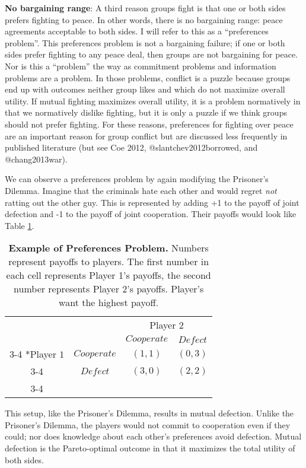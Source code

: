 \documentclass[11pt]{article}
\begin{document}
\textbf{No bargaining range}: A third reason groups fight is that one or
both sides prefers fighting to peace. In other words, there is no
bargaining range: peace agreements acceptable to both sides. I will
refer to this as a ``preferences problem''. This preferences problem is
not a bargaining failure; if one or both sides prefer fighting to any
peace deal, then groups are not bargaining for peace. Nor is this a
``problem'' the way as commitment problems and information problems are
a problem. In those problems, conflict is a puzzle because groups end up
with outcomes neither group likes and which do not maximize overall
utility. If mutual fighting maximizes overall utility, it is a problem
normatively in that we normatively dislike fighting, but it is only a
puzzle if we think groups should not prefer fighting. For these reasons,
preferences for fighting over peace are an important reason for group
conflict but are discussed less frequently in published literature (but
see Coe 2012, @slantchev2012borrowed, and @chang2013war).

We can observe a preferences problem by again modifying the Prisoner's
Dilemma. Imagine that the criminals hate each other and would regret
\emph{not} ratting out the other guy. This is represented by adding +1
to the payoff of joint defection and -1 to the payoff of joint
cooperation. Their payoffs would look like Table \ref{tab:prefProb}.

\begin{table}[h!]
\begin{center}
\setlength{\extrarowheight}{2pt}
\begin{tabular}{cc|c|c|}
    & \multicolumn{1}{c}{} & \multicolumn{2}{c}{Player $2$}\\
    & \multicolumn{1}{c}{} & \multicolumn{1}{c}{$Cooperate$}  & \multicolumn{1}{c}{$Defect$} \\\cline{3-4}
    \multirow{2}*{Player $1$}  & $Cooperate$ & $(1,1)$ & $(0,3)$ \\\cline{3-4}
      & $Defect$ & $(3,0)$ & $(2,2)$ \\\cline{3-4}
\end{tabular}
\caption{\label{tab:prefProb}\textbf{Example of Preferences Problem.} Numbers represent payoffs to players.  The first number in each cell represents Player 1's payoffs, the second number represents Player 2's payoffs.  Player's want the highest payoff.}
\end{center}
\end{table}

This setup, like the Prisoner's Dilemma, results in mutual defection.
Unlike the Prisoner's Dilemma, the players would not commit to
cooperation even if they could; nor does knowledge about each other's
preferences avoid defection. Mutual defection is the Pareto-optimal
outcome in that it maximizes the total utility of both sides.
\end{document}
